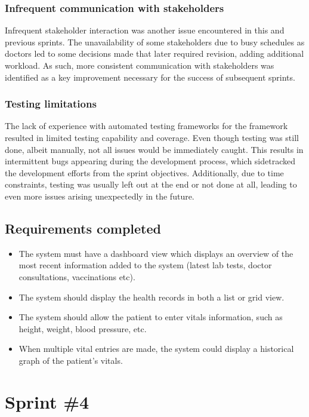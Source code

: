 \subsubsection{Infrequent communication with stakeholders}

Infrequent stakeholder interaction was another issue encountered in this and previous sprints. The unavailability of some stakeholders due to busy schedules as doctors led to some decisions made that later required revision, adding additional workload. As such, more consistent communication with stakeholders was identified as a key improvement necessary for the success of subsequent sprints. 

\subsubsection{Testing limitations}

The lack of experience with automated testing frameworks for the framework resulted in limited testing capability and coverage. Even though testing was still done, albeit manually, not all issues would be immediately caught. This results in intermittent bugs appearing during the development process, which sidetracked the development efforts from the sprint objectives. Additionally, due to time constraints, testing was usually left out at the end or not done at all, leading to even more issues arising unexpectedly in the future.

\subsection{Requirements completed}

\begin{itemize}
    \item The system must have a dashboard view which displays an overview of the most recent information added to the system (latest lab tests, doctor consultations, vaccinations etc).
    \item The system should display the health records in both a list or grid view.
    \item The system should allow the patient to enter vitals information, such as height, weight, blood pressure, etc.
    \item When multiple vital entries are made, the system could display a historical graph of the patient's vitals.
\end{itemize}

\section{Sprint \#4}

